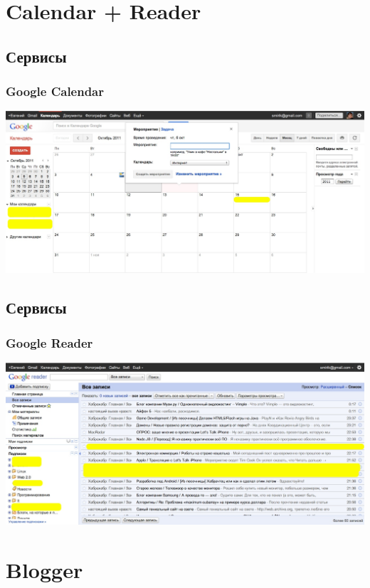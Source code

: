 \documentclass[compress,red]{beamer}
\begin{document}
\section{Calendar + Reader}
\subsection{Сервисы}
\begin{frame}
  \frametitle{Google Calendar}
	\centerline{\includegraphics[width=1.0\textwidth]{images/calendar.jpg}}
\end{frame}

\subsection{Сервисы}
\begin{frame}
  \frametitle{Google Reader}
	\centerline{\includegraphics[width=1.0\textwidth]{images/reader.jpg}}
\end{frame}

\section{Blogger}
\end{document}
